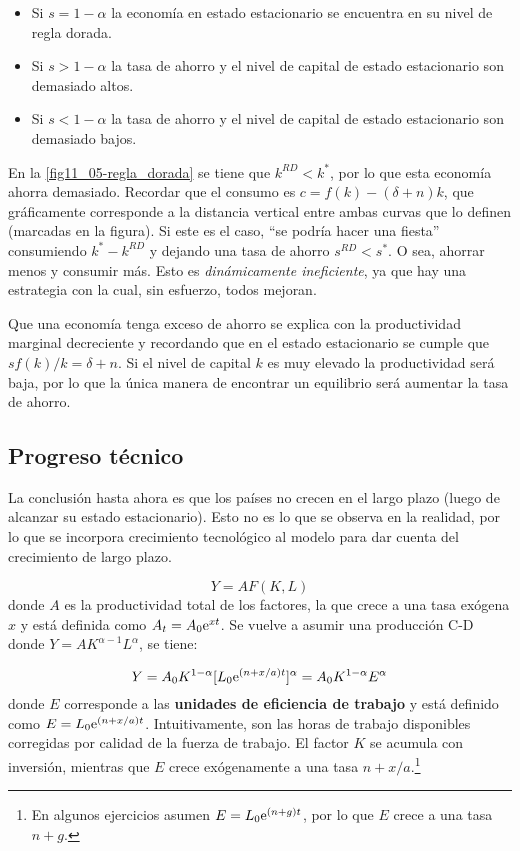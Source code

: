 \documentclass[DeGregorioResumen]{subfiles}
\begin{document}
\begin{itemize}
\item Si $s=1-\alpha$ la economía en estado estacionario se encuentra en su nivel de regla dorada.
\item Si $s>1-\alpha$ la tasa de ahorro y el nivel de capital de estado estacionario son demasiado altos.
\item Si $s<1-\alpha$ la tasa de ahorro y el nivel de capital de estado estacionario son demasiado bajos.
\end{itemize}



En la \autoref{fig11_05-regla_dorada} se tiene que $k^{RD}<k^*$, por lo que esta economía ahorra demasiado. Recordar que el consumo es $c=f(k)-(\delta +n)k$, que gráficamente corresponde a la distancia vertical entre ambas curvas que lo definen (marcadas en la figura). Si este es el caso, ``se podría hacer una fiesta'' consumiendo $k^*-k^{RD}$ y dejando una tasa de ahorro $s^{RD}<s^*$. O sea, ahorrar menos y consumir más. Esto es \textit{dinámicamente ineficiente}, ya que hay una estrategia con la cual, sin esfuerzo, todos mejoran.

Que una economía tenga exceso de ahorro se explica con la productividad marginal decreciente y recordando que en el estado estacionario se cumple que $sf(k)/k=\delta +n$. Si el nivel de capital $k$ es muy elevado la productividad será baja, por lo que la única manera de encontrar un equilibrio será aumentar la tasa de ahorro.

\subsection{Progreso técnico}
La conclusión hasta ahora es que los países no crecen en el largo plazo (luego de alcanzar su estado estacionario). Esto no es lo que se observa en la realidad, por lo que se incorpora crecimiento tecnológico al modelo para dar cuenta del crecimiento de largo plazo.

\begin{equation*}
Y=AF(K,L)
\end{equation*}
donde $A$ es la productividad total de los factores, la que crece a una tasa exógena $x$ y está definida como $A_t=A_0\mathrm{e}^{xt}$. Se vuelve a asumir una producción C-D donde $Y=AK^{\alpha-1}L^\alpha$, se tiene:

\begin{equation*}
Y=A_0K^{1-\alpha} [L_0 \mathrm{e}^{(n+x/a)t}]^\alpha = A_0K^{1-\alpha}E^{\alpha}
\end{equation*}
donde $E$ corresponde a las \textbf{unidades de eficiencia de trabajo} y está definido como $E=L_0\mathrm{e}^{(n+x/a)t}$. Intuitivamente, son las horas de trabajo disponibles corregidas por calidad de la fuerza de trabajo. El factor $K$ se acumula con inversión, mientras que $E$ crece exógenamente a una tasa $n+x/a$.\footnote{En algunos ejercicios asumen $E=L_0\mathrm{e}^{(n+g)t}$, por lo que $E$ crece a una tasa $n+g$.}
\end{document}
